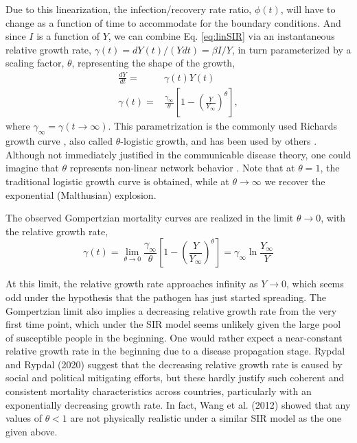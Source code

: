 \documentclass{article}
\begin{document}
 Due to this linearization, the infection/recovery rate ratio, $\phi(t)$, will have to change as a function of time to accommodate for the boundary conditions. And since $I$ is a function of $Y$, we can combine Eq. \ref{eq:linSIR} via an instantaneous relative growth rate, $\gamma(t) = dY(t) /(Ydt) = \beta I / Y$, in turn parameterized by a scaling factor, $\theta$, representing the shape of the growth,
\begin{subequations}
\label{eq:rypdal}
\begin{align}
\frac{dY}{dt} =& \gamma(t) Y(t) \label{eq:rypdalODE}\\
\gamma(t) =& \frac{\gamma_{\infty}}{\theta}\left[1 - \left(\frac{Y}{Y_{\infty}}\right)^{\theta} \right] \label{eq:rypdalGamma},
\end{align}
\end{subequations}
where $\gamma_{\infty} = \gamma(t\rightarrow \infty)$. This parametrization is the commonly used Richards growth curve \cite{richards1959flexible}, also called $\theta$-logistic growth, and has been used by others \cite{wu2020generalized}. Although not immediately justified in the communicable disease theory, one could imagine that $\theta$ represents non-linear network behavior \cite{petroni2020logistic}. Note that at $\theta=1$, the traditional logistic growth curve is obtained, while at $\theta\rightarrow \infty$ we recover the exponential (Malthusian) explosion.

The observed Gompertzian mortality curves are realized in the limit $\theta \rightarrow 0$, with the relative growth rate, 
\begin{equation}
\label{eq:rypdalLimit}
\gamma(t) = \lim_{\theta \rightarrow 0}\frac{\gamma_{\infty}}{\theta}\left[1 - \left(\frac{Y}{Y_{\infty}}\right)^{\theta} \right]
= \gamma_{\infty}\ln{\frac{Y_{\infty}}{Y}}
\end{equation}

 At this limit, the relative growth rate approaches infinity as $Y \rightarrow 0$, which seems odd under the hypothesis that the pathogen has just started spreading. 
 The Gompertzian limit also implies a decreasing relative growth rate from the very first time point, which under the SIR model seems unlikely given the large pool of susceptible people in the beginning. 
 One would rather expect a near-constant relative growth rate in the beginning due to a disease propagation stage. 
 Rypdal and Rypdal (2020) \cite{Rypdal2020} suggest that the decreasing relative growth rate is caused by social and political mitigating efforts, but these hardly justify such coherent and consistent mortality characteristics across countries, particularly with an exponentially decreasing growth rate. In fact, Wang et al. (2012) \cite{wang2012richards} showed that any values of $\theta<1$ are not physically realistic under a similar SIR model as the one given above. 
 
\end{document}
